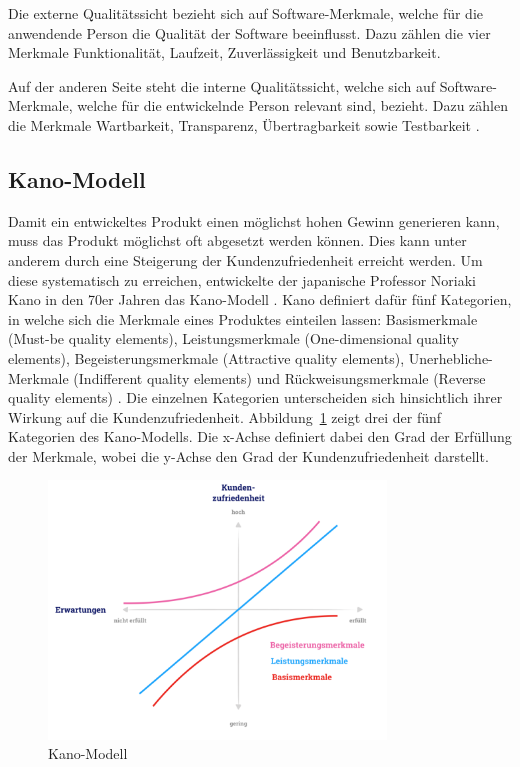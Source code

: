 Die externe Qualitätssicht bezieht sich auf Software-Merkmale, welche für die anwendende Person die Qualität der Software beeinflusst.
Dazu zählen die vier Merkmale Funktionalität, Laufzeit, Zuverlässigkeit und Benutzbarkeit.

Auf der anderen Seite steht die interne Qualitätssicht, welche sich auf Software-Merkmale, welche für die entwickelnde Person relevant sind, bezieht.
Dazu zählen die Merkmale Wartbarkeit, Transparenz, Übertragbarkeit sowie Testbarkeit \autocite[vgl.][S. 6-10]{hoffmann_software-qualitat_2013}.

\subsection{Kano-Modell}
Damit ein entwickeltes Produkt einen möglichst hohen Gewinn generieren kann, muss das Produkt möglichst oft abgesetzt werden können.
Dies kann unter anderem durch eine Steigerung der Kundenzufriedenheit erreicht werden.
Um diese systematisch zu erreichen, entwickelte der japanische Professor Noriaki Kano in den 70er Jahren das Kano-Modell \autocite[vgl.][S. 27]{sauerwein_kano-modell_2000}.
Kano definiert dafür fünf Kategorien, in welche sich die Merkmale eines Produktes einteilen lassen: 
Basismerkmale (Must-be quality elements), Leistungsmerkmale (One-dimensional quality elements), Begeisterungsmerkmale (Attractive quality elements), Unerhebliche-Merkmale (Indifferent quality elements) und Rückweisungsmerkmale (Reverse quality elements) \autocite[vgl.][S. 82-83]{holzing_kano-theorie_2008}.
\newparagraph
Die einzelnen Kategorien unterscheiden sich hinsichtlich ihrer Wirkung auf die Kundenzufriedenheit.
Abbildung~\ref{fig:kano-modell} zeigt drei der fünf Kategorien des Kano-Modells.
Die x-Achse definiert dabei den Grad der Erfüllung der Merkmale, wobei die y-Achse den Grad der Kundenzufriedenheit darstellt.
\begin{figure}[H]
  \centering
  \includegraphics[width=0.8\textwidth, keepaspectratio]{images/kano-modell.png}
  \caption{Kano-Modell \autocite{diehl_kano_2019}}
  \label{fig:kano-modell}
\end{figure}\noindent
